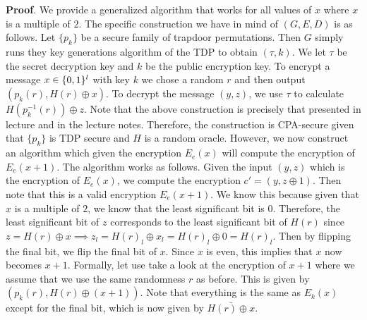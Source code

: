 \documentclass{article}
\begin{document}
\begin{enumerate}
\begin{enumerate}[noitemsep,topsep=\mdcompacttopsep,label=\alph*.]
\begin{mdbmarginx}{1ex}{0pt}{1ex}{0pt}%
\noindent{}\textbf{Proof}.  We provide a generalized algorithm that works for all values of $x$ where $x$ is a multiple of $2$. 
The specific construction we have in mind of $(G,E,D)$ is as follows. Let $\{p_k\}$ be a 
secure family of trapdoor permutations. Then $G$ simply runs they key generations algorithm
of the TDP to obtain $(\tau,k)$. We let $\tau$ be the secret decryption key and $k$ be the public
encryption key. To encrypt a message $x \in \{0,1\}^l$ with key $k$ we chose a random $r$ and then output
$(p_k(r), H(r) \oplus x)$. To decrypt the message $(y,z)$, we use $\tau$ to calculate $H(p_k^{-1}(r)) \oplus z$. 
Note that the above construction is precisely that presented in lecture and in the lecture notes.
Therefore, the construction is CPA-secure given that $\{p_k\}$ is TDP secure and $H$ is a random oracle. 
However, we now construct an algorithm which given the encryption $E_e(x)$ will compute 
the encryption of $E_e(x+1)$. The algorithm works as follows. Given the input $(y,z)$ which is
the encryption of $E_e(x)$, we compute the encryption $c' = (y,z \oplus 1)$. Then note that this is a valid
encryption $E_e(x+1)$. We know this because given that $x$ is a multiple of $2$, we know that the
least significant bit is $0$. Therefore, the least significant bit of $z$ corresponds to the least
significant bit of $H(r)$ since $z = H(r) \oplus x \implies z_l = H(r)_l \oplus x_l = H(r)_l \oplus 0 = H(r)_l$.
Then by flipping the final bit, we flip the final bit of $x$. Since $x$ is even, this implies that
$x$ now becomes $x+1$. Formally, let use take a look at the encryption of $x+1$ where we assume that
we use the same randomness $r$ as before. This is given by $(p_k(r), H(r) \oplus (x + 1))$. Note that
everything is the same as $E_k(x)$ except for the final bit, which is now given by $\bar{H(r) \oplus x}$.%
\end{mdbmarginx}%


\end{enumerate}
\end{enumerate}
\end{document}
